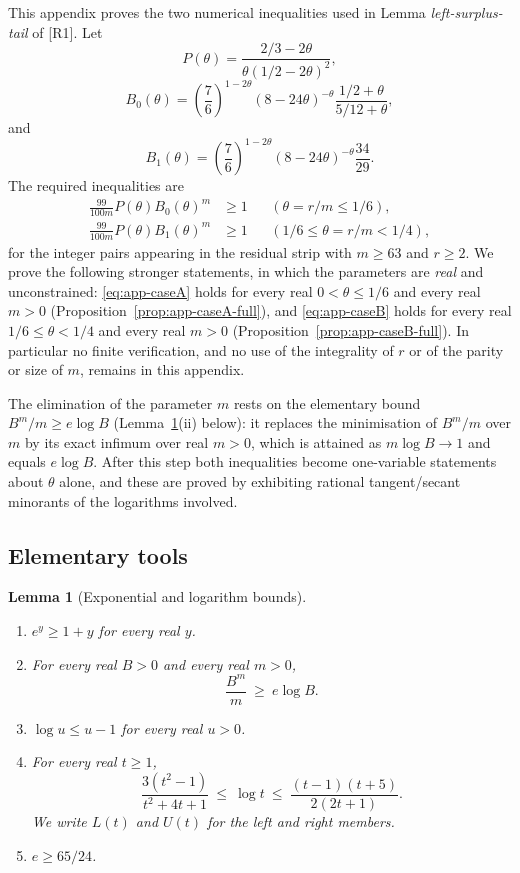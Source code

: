 \documentclass[11pt]{article}
\newtheorem{lemma}[theorem]{Lemma}
\theoremstyle{remark}
\theoremstyle{plain}
\theoremstyle{plain}
\begin{document}
This appendix proves the two numerical inequalities used in
Lemma \emph{left-surplus-tail} of [R1].  Let
\[
        P(\theta)=\frac{2/3-2\theta}{\theta(1/2-2\theta)^2},
\]
\[
        B_0(\theta)=
        \left(\frac76\right)^{1-2\theta}
        (8-24\theta)^{-\theta}
        \frac{1/2+\theta}{5/12+\theta},
\]
and
\[
        B_1(\theta)=
        \left(\frac76\right)^{1-2\theta}
        (8-24\theta)^{-\theta}
        \frac{34}{29}.
\]
The required inequalities are
\begin{align}
        \frac{99}{100m}P(\theta)B_0(\theta)^m&\ge1
        &&(\theta=r/m\le1/6),\label{eq:app-caseA}\\
        \frac{99}{100m}P(\theta)B_1(\theta)^m&\ge1
        &&(1/6\le\theta=r/m<1/4),\label{eq:app-caseB}
\end{align}
for the integer pairs appearing in the residual strip with $m\ge63$ and
$r\ge2$.  We prove the following stronger statements, in which the parameters
are \emph{real} and unconstrained: \eqref{eq:app-caseA} holds for every real
$0<\theta\le1/6$ and every real $m>0$
(Proposition~\ref{prop:app-caseA-full}), and \eqref{eq:app-caseB} holds for
every real $1/6\le\theta<1/4$ and every real $m>0$
(Proposition~\ref{prop:app-caseB-full}).  In particular no finite
verification, and no use of the integrality of $r$ or of the parity or size
of $m$, remains in this appendix.

The elimination of the parameter $m$ rests on the elementary bound
$B^m/m\ge e\log B$ (Lemma~\ref{lem:app-tools}(ii) below): it replaces the
minimisation of $B^m/m$ over $m$ by its exact infimum over real $m>0$, which
is attained as $m\log B\to1$ and equals $e\log B$.  After this step both
inequalities become one-variable statements about $\theta$ alone, and these
are proved by exhibiting rational tangent/secant minorants of the logarithms
involved.

\subsection*{Elementary tools}

\begin{lemma}[Exponential and logarithm bounds]\label{lem:app-tools}
\begin{enumerate}[label=\textup{(\roman*)}]
\item $e^{y}\ge1+y$ for every real $y$.
\item For every real $B>0$ and every real $m>0$,
\[
        \frac{B^m}{m}\ \ge\ e\log B .
\]
\item $\log u\le u-1$ for every real $u>0$.
\item For every real $t\ge1$,
\[
        \frac{3(t^2-1)}{t^2+4t+1}
        \ \le\ \log t\ \le\
        \frac{(t-1)(t+5)}{2(2t+1)} .
\]
We write $L(t)$ and $U(t)$ for the left and right members.
\item $e\ge 65/24$.
\end{enumerate}
\end{lemma}
\end{document}
